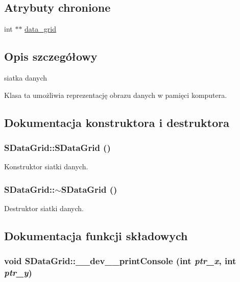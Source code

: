 \subsection*{Atrybuty chronione}
\begin{CompactItemize}
\item 
int $\ast$$\ast$ \hyperlink{classSDataGrid_6401d181afc8b06f75fcec860b02e9cb}{data\_\-grid}
\end{CompactItemize}


\subsection{Opis szczegółowy}
siatka danych 

Klasa ta umożliwia reprezentację obrazu danych w pamięci komputera. 

\subsection{Dokumentacja konstruktora i destruktora}
\hypertarget{classSDataGrid_741ea12ba0eec8c00fec30c8730f2192}{
\subsubsection[{SDataGrid}]{\setlength{\rightskip}{0pt plus 5cm}SDataGrid::SDataGrid ()}}
\label{classSDataGrid_741ea12ba0eec8c00fec30c8730f2192}


Konstruktor siatki danych. \hypertarget{classSDataGrid_51645b217b4c668e0e945cdbda1db3ec}{
\subsubsection[{$\sim$SDataGrid}]{\setlength{\rightskip}{0pt plus 5cm}SDataGrid::$\sim$SDataGrid ()}}
\label{classSDataGrid_51645b217b4c668e0e945cdbda1db3ec}


Destruktor siatki danych. 

\subsection{Dokumentacja funkcji składowych}
\hypertarget{classSDataGrid_8b94af72ddf880b0297baf24ceb2395a}{
\subsubsection[{\_\-\_\-dev\_\-\_\-printConsole}]{\setlength{\rightskip}{0pt plus 5cm}void SDataGrid::\_\-\_\-dev\_\-\_\-printConsole (int {\em ptr\_\-x}, \/  int {\em ptr\_\-y})}}
\label{classSDataGrid_8b94af72ddf880b0297baf24ceb2395a}


